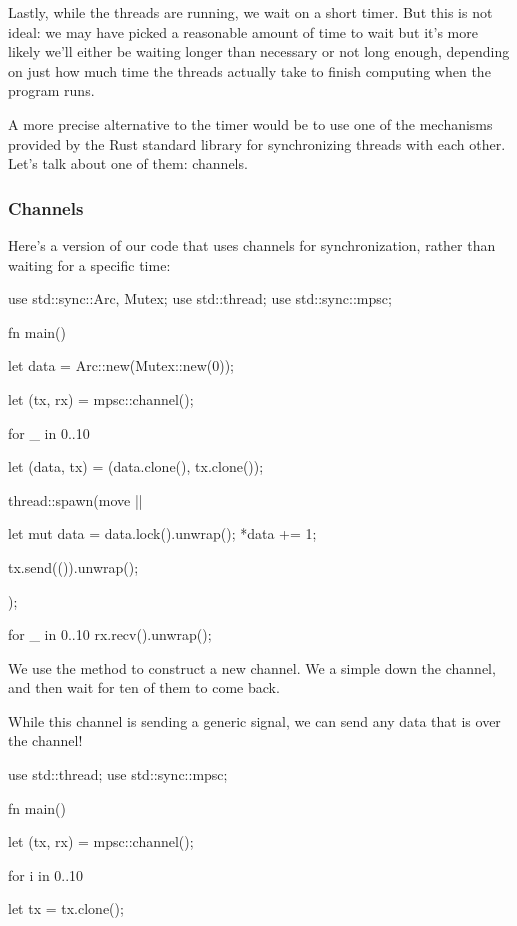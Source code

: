 {\blank

Lastly, while the threads are running, we wait on a short timer. But this is not ideal: we may have picked a reasonable amount of 
time to wait but it's more likely we'll either be waiting longer than necessary or not long enough, depending on just how much time 
the threads actually take to finish computing when the program runs.

\blank

A more precise alternative to the timer would be to use one of the mechanisms provided by the Rust standard library for synchronizing 
threads with each other. Let's talk about one of them: channels.

\subsubsection*{Channels}

Here's a version of our code that uses channels for synchronization, rather than waiting for a specific time:

\begin{rustc}
use std::sync::{Arc, Mutex};
use std::thread;
use std::sync::mpsc;

fn main() {
    let data = Arc::new(Mutex::new(0));

    let (tx, rx) = mpsc::channel();

    for _ in 0..10 {
        let (data, tx) = (data.clone(), tx.clone());

        thread::spawn(move || {
            let mut data = data.lock().unwrap();
            *data += 1;

            tx.send(()).unwrap();
        });
    }

    for _ in 0..10 {
        rx.recv().unwrap();
    }
}
\end{rustc}

We use the  method to construct a new channel. We  a simple \code{()} down the channel, and then 
wait for ten of them to come back.

\blank

While this channel is sending a generic signal, we can send any data that is  over the channel!

\begin{rustc}
use std::thread;
use std::sync::mpsc;

fn main() {
    let (tx, rx) = mpsc::channel();

    for i in 0..10 {
        let tx = tx.clone();

}}
\end{rustc}}
